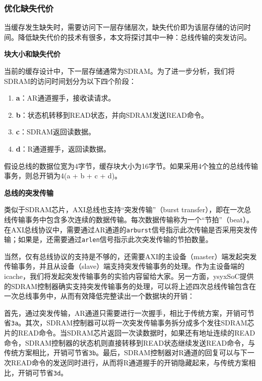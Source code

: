\subsubsection{优化缺失代价}\label{sec:09-cache-029}

当缓存发生缺失时，需要访问下一层存储层次，缺失代价即为该层存储的访问时间。降低缺失代价的技术有很多，本文将探讨其中一种：总线传输的突发访问。

\textbf{块大小和缺失代价}

当前的缓存设计中，下一层存储通常为SDRAM。为了进一步分析，我们将SDRAM的访问时间划分为以下四个阶段：

\begin{enumerate}
\def\labelenumi{\arabic{enumi}.}
\tightlist
\item
  \textbf{a}：AR通道握手，接收读请求。
\item
  \textbf{b}：状态机转移到READ状态，并向SDRAM发送READ命令。
\item
  \textbf{c}：SDRAM返回读数据。
\item
  \textbf{d}：R通道握手，返回读数据。
\end{enumerate}

假设总线的数据位宽为4字节，缓存块大小为16字节。如果采用4个独立的总线传输事务，则总开销为4(a + b + c + d)。

\textbf{总线的突发传输}

类似于SDRAM芯片，AXI总线也支持``突发传输''（burst transfer），即在一次总线传输事务中包含多次连续的数据传输。每次数据传输称为一个``节拍''（beat）。在AXI总线协议中，需要通过AR通道的\texttt{arburst}信号指示此次传输是否采用突发传输；如果是，还需要通过\texttt{arlen}信号指示此次突发传输的节拍数量。

当然，仅有总线协议的支持是不够的，还需要AXI的主设备（master）端发起突发传输事务，并且从设备（slave）端支持突发传输事务的处理。作为主设备端的icache，我们将发起突发传输事务的实验内容留给大家。另一方面，ysyxSoC提供的SDRAM控制器确实支持突发传输事务的处理，可以将上述四次总线传输包含在一次总线事务中，从而有效降低完整读出一个数据块的开销：

首先，通过突发传输，AR通道只需要进行一次握手，相比于传统方案，开销可节省\texttt{3a}。其次，SDRAM控制器可以将一次突发传输事务拆分成多个发往SDRAM芯片的READ命令。当SDRAM芯片返回一次读数据时，如果还有地址连续的READ命令，SDRAM控制器的状态机则直接转移到READ状态继续发送READ命令，与传统方案相比，开销可节省\texttt{3b}。最后，SDRAM控制器对R通道的回复可以与下一次READ命令的发送同时进行，从而将R通道握手的开销隐藏起来，与传统方案相比，开销可节省\texttt{3d}。


